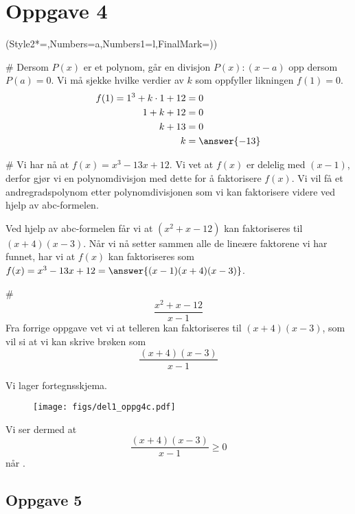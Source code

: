 \section*{Oppgave 4}
\begin{easylist}[enumerate]
	\ListProperties(Style2*=,Numbers=a,Numbers1=l,FinalMark={)})
	
	# Dersom $P(x)$ er et polynom, går en divisjon $P(x) : (x-a)$ opp dersom $P(a) = 0$. 
	Vi må sjekke hvilke verdier av $k$ som oppfyller likningen $f(1)= 0$.
	\begin{align*}
		f(1) = 1^3 + k \cdot 1 + 12 &= 0 \\
		1+k+12 & =0 \\
		k + 13 & = 0 \\
		k & =  \answer{-13}
	\end{align*}
	
	# Vi har nå at $f(x) = x^3 - 13x + 12$. 
	Vi vet at $f(x)$ er delelig med $(x-1)$, derfor gjør vi en polynomdivisjon med dette for å faktorisere $f(x)$. 
	Vi vil få et andregradspolynom etter polynomdivisjonen som vi kan faktorisere videre ved hjelp av abc-formelen. 
	\newline
	\newline
	
	Ved hjelp av abc-formelen får vi at $(x^2 + x - 12)$ kan faktoriseres til $(x+4)(x-3)$. 
	Når vi nå setter sammen alle de lineære faktorene vi har funnet, har vi at $f(x)$ kan faktoriseres som 
	$f(x) = x^3 - 13x + 12 = \answer{(x-1)(x+4)(x-3)}$.
	
	# $$\frac{x^2 + x -12}{x-1}$$
	Fra forrige oppgave vet vi at telleren kan faktoriseres til $(x+4)(x-3)$, som vil si at vi kan skrive brøken som $$\frac{(x+4)(x-3)}{x-1}$$
	
	Vi lager fortegnsskjema.
	\begin{figure}[ht!]
		\centering
		\texttt{[image: figs/del1\_oppg4c.pdf]}
		\label{fig:del1_oppg4c}
	\end{figure}
	
	Vi ser dermed at 
	\begin{equation*}
		\frac{(x+4)(x-3)}{x-1} \geq 0
	\end{equation*}
	når .
	
\end{easylist}

\subsection*{Oppgave 5}

